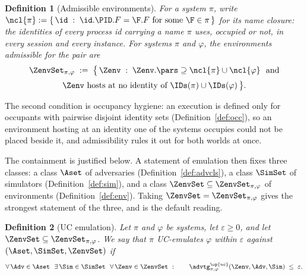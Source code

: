 \documentclass[10pt,oneside,openany]{book}
\theoremstyle{accentdef}
\newtheorem{definition}{Definition}[chapter]
\theoremstyle{accentplain}
\begin{document}
\begin{definition}[Admissible environments]\label{def:admis}
For a system $\pi$, write $\ncl{\pi} := \{\, \id \;:\; \id.\PID.F = \F.F \ \text{for some}\
\F \in \pi \,\}$ for its \emph{name closure}: the identities of every process id carrying a name
$\pi$ uses, occupied or not, in every session and every instance. For systems $\pi$ and
$\varphi$, the environments \emph{admissible} for the pair are
\[
  \begin{gathered}
  \ZenvSet_{\pi,\varphi} \;:=\; \bigl\{\, \Zenv \;:\; \Zenv.\pars \supseteq \ncl{\pi} \cup \ncl{\varphi}
  \ \text{ and} \\[2pt]
  \Zenv \text{ hosts at no identity of } \IDs(\pi) \cup \IDs(\varphi) \,\bigr\} .
  \end{gathered}
\]
\end{definition}

The second condition is occupancy hygiene: an execution is defined only for occupants with
pairwise disjoint identity sets (Definition~\ref{def:occ}), so an environment hosting at an identity one
of the systems occupies could not be placed beside it, and admissibility rules it out for both
worlds at once.

The containment is justified below. A statement of emulation then fixes three classes: a class
$\Aset$ of adversaries (Definition~\ref{def:advcls}), a class $\SimSet$ of simulators
(Definition~\ref{def:sim}), and a class
$\ZenvSet \subseteq \ZenvSet_{\pi,\varphi}$ of environments (Definition~\ref{def:env}). Taking
$\ZenvSet = \ZenvSet_{\pi,\varphi}$ gives the strongest statement of the three, and is the
default reading.

\begin{definition}[UC emulation]\label{def:uc}
Let $\pi$ and $\varphi$ be systems, let $\varepsilon \geq 0$, and let $\ZenvSet \subseteq \ZenvSet_{\pi,\varphi}$.
We say that $\pi$ \emph{UC-emulates} $\varphi$ \emph{within $\varepsilon$ against}
$(\Aset,\SimSet,\ZenvSet)$ if
\[
  \forall\, \Adv \in \Aset \ \ \exists\, \Sim \in \SimSet \ \ \forall\, \Zenv \in \ZenvSet \ : \qquad
  \advtg^{\op{uc}}_{\pi,\varphi}(\Zenv,\Adv,\Sim) \;\leq\; \varepsilon .
\]
\end{definition}
\end{document}
